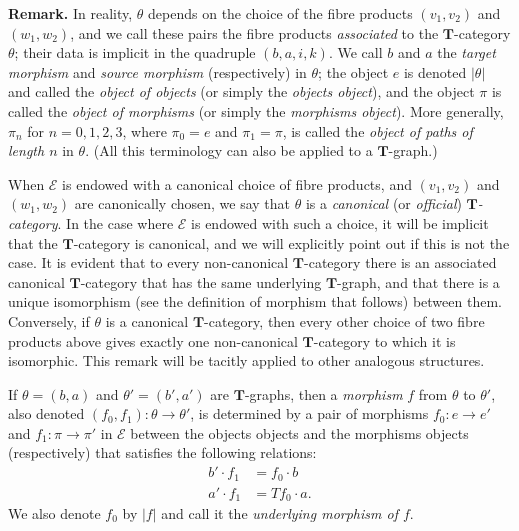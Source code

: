 \documentclass{article}
\newenvironment{rmenv}[1]
  {\phantomsection\par\medskip\noindent\textbf{#1.}\rmfamily}
  {\par\medskip}
\newcommand{\oldpage}[1]{\marginpar{\footnotesize$\Big\vert$ \textit{p.~#1}}}
\newcommand{\TT}{\mathbf{T}}
\newcommand{\cat}[1]{\mathcal{#1}}
\newcommand{\set}[1]{|#1|}
\begin{document}
\begin{rmenv}{Remark}
  \oldpage{227}
  In reality, $\theta$ depends on the choice of the fibre products $(v_1,v_2)$ and $(w_1,w_2)$, and we call these pairs the fibre products \emph{associated} to the $\TT$-category $\theta$;
  their data is implicit in the quadruple $(b,a,i,k)$.
  We call $b$ and $a$ the \emph{target morphism} and \emph{source morphism} (respectively) in $\theta$;
  the object $e$ is denoted $\set{\theta}$ and called the \emph{object of objects} (or simply the \emph{objects object}), and the object $\pi$ is called the \emph{object of morphisms} (or simply the \emph{morphisms object}).
  More generally, $\pi_n$ for $n=0,1,2,3$, where $\pi_0=e$ and $\pi_1=\pi$, is called the \emph{object of paths of length $n$} in $\theta$.
  (All this terminology can also be applied to a $\TT$-graph.)

  When $\cat{E}$ is endowed with a canonical choice of fibre products, and $(v_1,v_2)$ and $(w_1,w_2)$ are canonically chosen, we say that $\theta$ is a \emph{canonical} (or \emph{official}) \emph{$\TT$-category}.
  In the case where $\cat{E}$ is endowed with such a choice, it will be implicit that the $\TT$-category is canonical, and we will explicitly point out if this is not the case.
  It is evident that to every non-canonical $\TT$-category there is an associated canonical $\TT$-category that has the same underlying $\TT$-graph, and that there is a unique isomorphism (see the definition of morphism that follows) between them.
  Conversely, if $\theta$ is a canonical $\TT$-category, then every other choice of two fibre products above gives exactly one non-canonical $\TT$-category to which it is isomorphic.
  This remark will be tacitly applied to other analogous structures.
\end{rmenv}

If $\theta=(b,a)$ and $\theta'=(b',a')$ are $\TT$-graphs, then a \emph{morphism} $f$ from $\theta$ to $\theta'$, also denoted $(f_0,f_1)\colon\theta\to\theta'$, is determined by a pair of morphisms $f_0\colon e\to e'$ and $f_1\colon\pi\to\pi'$ in $\cat{E}$ between the objects objects and the morphisms objects (respectively) that satisfies the following relations:
\[
  \begin{aligned}
    b'\cdot f_1
    &= f_0\cdot b
  \\a'\cdot f_1
    &= Tf_0\cdot a.
  \end{aligned}
  \tag{1'}
\]
We also denote $f_0$ by $\set{f}$ and call it the \emph{underlying morphism of $f$}.
\end{document}
